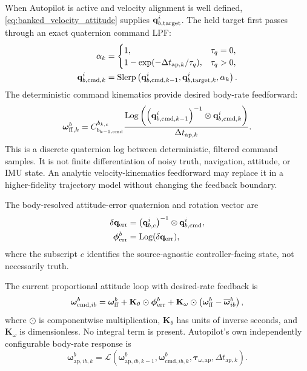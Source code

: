 When Autopilot is active and velocity alignment is well defined,
\cref{eq:banked_velocity_attitude} supplies
$\mathbf{q}_{b,\mathrm{target}}^{i}$. The held target first passes through an exact
quaternion command LPF:
\begin{align}
\alpha_k
&=
\begin{cases}
1, & \tau_q=0,\\
1-\exp(-\Delta t_{\mathrm{ap},k}/\tau_q), & \tau_q>0,
\end{cases}\\
\mathbf{q}_{b,\mathrm{cmd},k}^{i}
&=
\operatorname{Slerp}
\left(
\mathbf{q}_{b,\mathrm{cmd},k-1}^{i},
\mathbf{q}_{b,\mathrm{target},k}^{i},
\alpha_k
\right).
\label{eq:autopilot_command_lpf}
\end{align}
The deterministic command kinematics provide desired body-rate feedforward:
\begin{equation}
\boldsymbol{\omega}_{\mathrm{ff},k}^{b}
=
C_{b_{k-1,\mathrm{cmd}}}^{b_{k,c}}
\frac{
\operatorname{Log}
\left(
\left(\mathbf{q}_{b,\mathrm{cmd},k-1}^{i}\right)^{-1}
\otimes
\mathbf{q}_{b,\mathrm{cmd},k}^{i}
\right)
}{
\Delta t_{\mathrm{ap},k}
}.
\label{eq:autopilot_command_rate_feedforward}
\end{equation}
This is a discrete quaternion log between deterministic, filtered command
samples. It is not finite differentiation of noisy truth, navigation, attitude,
or IMU state. An analytic velocity-kinematics feedforward may replace it in a
higher-fidelity trajectory model without changing the feedback boundary.

The body-resolved attitude-error quaternion and rotation vector are
\begin{align}
\delta\mathbf{q}_{\mathrm{err}}
&=
\left(\mathbf{q}_{b,c}^{i}\right)^{-1}
\otimes
\mathbf{q}_{b,\mathrm{cmd}}^{i},\\
\boldsymbol{\phi}_{\mathrm{err}}^{b}
&=\operatorname{Log}(\delta\mathbf{q}_{\mathrm{err}}),
\label{eq:trajectory_attitude_error}
\end{align}
where the subscript $c$ identifies the source-agnostic controller-facing
state, not necessarily truth.

The current proportional attitude loop with desired-rate feedback is
\begin{equation}
\boldsymbol{\omega}_{\mathrm{cmd},ib}^{b}
=
\boldsymbol{\omega}_{\mathrm{ff}}^{b}
+
\mathbf{K}_{\theta}
\odot
\boldsymbol{\phi}_{\mathrm{err}}^{b}
+
\mathbf{K}_{\omega}
\odot
\left(
\boldsymbol{\omega}_{\mathrm{ff}}^{b}
-
\overline{\boldsymbol{\omega}}_{ib}^{b}
\right),
\label{eq:autopilot_rate_command}
\end{equation}
where $\odot$ is componentwise multiplication,
$\mathbf{K}_{\theta}$ has units of inverse seconds, and
$\mathbf{K}_{\omega}$ is dimensionless. No integral term is present.
Autopilot's own independently
configurable body-rate response is
\begin{equation}
\boldsymbol{\omega}_{\mathrm{ap},ib,k}^{b}
=
\mathcal{L}\!\left(
\boldsymbol{\omega}_{\mathrm{ap},ib,k-1}^{b},
\boldsymbol{\omega}_{\mathrm{cmd},ib,k}^{b},
\boldsymbol{\tau}_{\omega,\mathrm{ap}},
\Delta t_{\mathrm{ap},k}
\right).
\label{eq:autopilot_rate_response}
\end{equation}

